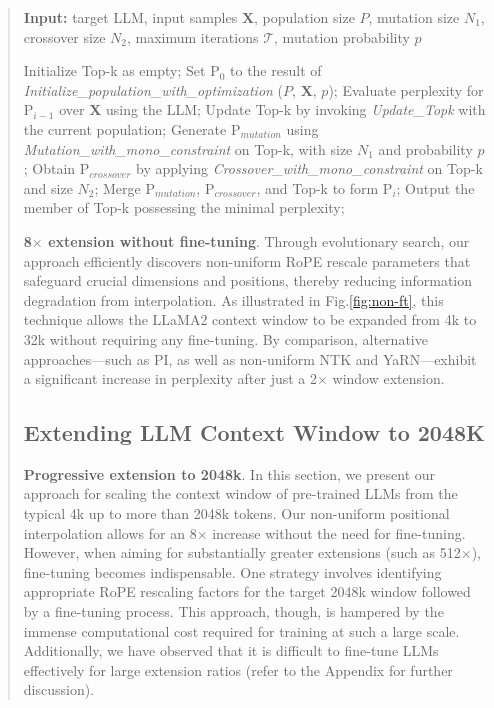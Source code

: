 \begin{abstract}
\begin{algorithm}[t]
	\small
	\caption{The search algorithm}
	\textbf{Input:} target LLM, input samples $\mathbf{X}$, population size $P$, mutation size $N_1$, crossover size $N_2$, maximum iterations $\mathcal{T}$, mutation probability $p$\\

	\begin{algorithmic}[1]
		\label{alg:search}
		\STATE Initialize Top-k as empty;
		\STATE Set $\text{P}_0$ to the result of \textit{Initialize\_population\_with\_optimization} ($P$, $\mathbf{X}$, $p$);
		\STATE Evaluate perplexity for $\text{P}_{i-1}$ over $\mathbf{X}$ using the LLM;
		\STATE Update Top-k by invoking \textit{Update\_Topk} with the current population;
		\STATE Generate $\text{P}_{mutation}$ using \textit{Mutation\_with\_mono\_constraint} on Top-k, with size $N_1$ and probability $p$;
		\STATE Obtain $\text{P}_{crossover}$ by applying \textit{Crossover\_with\_mono\_constraint} on Top-k and size $N_2$;
		\STATE Merge $\text{P}_{mutation}$, $\text{P}_{crossover}$, and Top-k to form $\text{P}_i$;
		\ENDFOR
		\STATE Output the member of Top-k possessing the minimal perplexity;
	\end{algorithmic}
\end{algorithm}

\textbf{8$\times$ extension without fine-tuning}. Through evolutionary search, our approach efficiently discovers non-uniform RoPE rescale parameters that safeguard crucial dimensions and positions, thereby reducing information degradation from interpolation. As illustrated in Fig.\ref{fig:non-ft}, this technique allows the LLaMA2 context window to be expanded from 4k to 32k without requiring any fine-tuning. By comparison, alternative approaches—such as PI, as well as non-uniform NTK and YaRN—exhibit a significant increase in perplexity after just a 2$\times$ window extension.

\subsection{Extending LLM Context Window to 2048K}
\label{sec:extendto2048k}

\textbf{Progressive extension to 2048k}. In this section, we present our approach for scaling the context window of pre-trained LLMs from the typical 4k up to more than 2048k tokens. Our non-uniform positional interpolation allows for an 8$\times$ increase without the need for fine-tuning. However, when aiming for substantially greater extensions (such as 512$\times$), fine-tuning becomes indispensable. One strategy involves identifying appropriate RoPE rescaling factors for the target 2048k window followed by a fine-tuning process. This approach, though, is hampered by the immense computational cost required for training at such a large scale. Additionally, we have observed that it is difficult to fine-tune LLMs effectively for large extension ratios (refer to the Appendix for further discussion).


\end{abstract}

